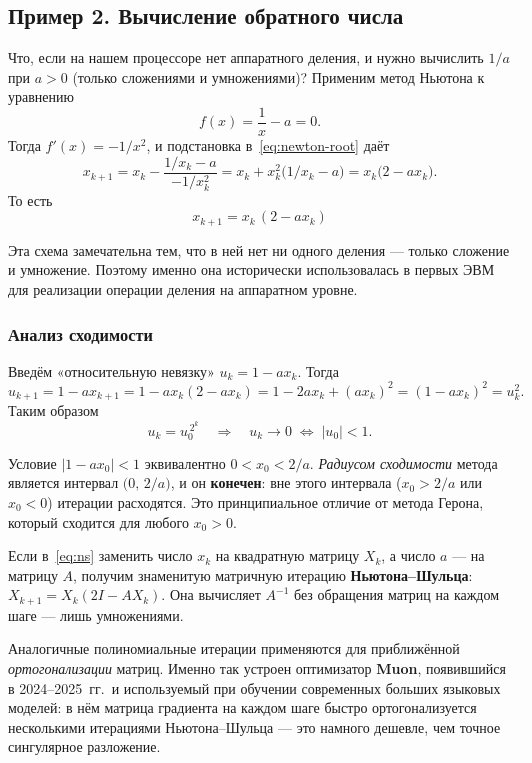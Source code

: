 \subsection{Пример 2. Вычисление обратного числа}

Что, если на нашем процессоре нет аппаратного деления, и нужно
вычислить $1/a$ при $a>0$ (только сложениями и умножениями)?
Применим метод Ньютона к уравнению
\[
f(x)=\dfrac{1}{x}-a=0.
\]
Тогда $f'(x)=-1/x^{2}$, и подстановка в~\eqref{eq:newton-root} даёт
\[
x_{k+1}=x_k-\dfrac{1/x_k-a}{-1/x_k^{2}}
       =x_k+x_k^{2}\bigl(1/x_k-a\bigr)
       =x_k\bigl(2-a x_k\bigr).
\]
То есть
\begin{equation}\label{eq:ns}
\boxed{\;x_{k+1}=x_k\,(2-a x_k)\;}
\end{equation}

Эта схема замечательна тем, что в ней нет ни одного деления — только
сложение и умножение. Поэтому именно она исторически использовалась
в первых ЭВМ для реализации операции деления на аппаратном уровне.

\subsubsection*{Анализ сходимости}

Введём «относительную невязку» $u_k=1-a x_k$. Тогда
\[
u_{k+1}=1-a x_{k+1}=1-a x_k(2-ax_k)=1-2 a x_k+(a x_k)^{2}=(1-a x_k)^{2}=u_k^{2}.
\]
Таким образом
\begin{equation}\label{eq:ns-error}
u_k=u_0^{\,2^{k}}\quad\Longrightarrow\quad u_k\to 0\;\Leftrightarrow\;|u_0|<1.
\end{equation}

Условие $|1-a x_0|<1$ эквивалентно $0<x_0<2/a$. \emph{Радиусом
сходимости} метода является интервал $\bigl(0,\,2/a\bigr)$, и
он \textbf{конечен}: вне этого интервала ($x_0>2/a$ или $x_0<0$)
итерации расходятся. Это принципиальное отличие от метода Герона,
который сходится для любого $x_0>0$.

\begin{notebox}[title={Метод Ньютона--Шульца и оптимизатор Muon}]
Если в~\eqref{eq:ns} заменить число $x_k$ на квадратную матрицу $X_k$,
а число $a$ — на матрицу $A$, получим знаменитую матричную итерацию
\textbf{Ньютона--Шульца}: $X_{k+1}=X_k(2I-A X_k)$. Она вычисляет
$A^{-1}$ без обращения матриц на каждом шаге — лишь умножениями.

Аналогичные полиномиальные итерации применяются для приближённой
\emph{ортогонализации} матриц. Именно так устроен оптимизатор
\textbf{Muon}, появившийся в 2024–2025~гг.\ и используемый при
обучении современных больших языковых моделей: в нём матрица
градиента на каждом шаге быстро ортогонализуется несколькими
итерациями Ньютона--Шульца — это намного дешевле, чем точное
сингулярное разложение.
\end{notebox}

